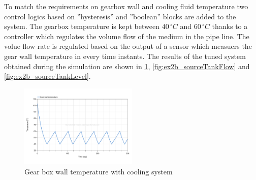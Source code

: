 \documentclass[11pt,a4paper,oneside]{article}
\begin{document}
To match the requirements on gearbox wall and cooling fluid temperature two control logics based on ''hysteresis'' and ''boolean'' blocks are added to the system.
The gearbox temperature is kept between $40\,^{\circ}C$ and $60\,^{\circ}C$ thanks to a controller which regulates the volume flow of the medium in the pipe line.
The volue flow rate is regulated based on the output of a sensor which measuers the gear wall temperature in every time instants.
The results of the tuned system obtained during the simulation are shown in \cref{fig:ex2b_gearWallTemp}, \cref{fig:ex2b_sourceTankFlow} and \cref{fig:ex2b_sourceTankLevel}.
\begin{figure}[H]
    \centering
    \includegraphics*[width=0.5\textwidth, keepaspectratio]{Figures/ex2b_gearWallTemp.pdf}
    \caption[]{\label{fig:ex2b_gearWallTemp} Gear box wall temperature with cooling system}
\end{figure}
\end{document}
